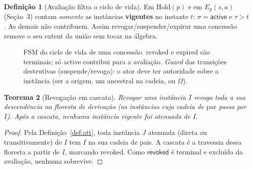 \documentclass[11pt,a4paper]{article}
\newtheorem{theorem}{Teorema}
\theoremstyle{definition}
\newtheorem{definition}[theorem]{Definição}
\begin{document}
\begin{definition}[Avaliação filtra o ciclo de vida]
Em $\mathrm{Hold}(p)$ e em $E_p(s,a)$ (Seção~3) contam \emph{somente} as
instâncias \textbf{vigentes} no instante $t$: $\sigma=\textsf{active}$ e
$\tau>t$. As demais não contribuem. Assim revogar/suspender/expirar uma
concessão remove o seu extent da união sem tocar na álgebra.
\end{definition}

\begin{figure}[h]
\centering
{}
\caption{FSM do ciclo de vida de uma concessão. \textsf{revoked} e
\textsf{expired} são terminais; só \textsf{active} contribui para a
avaliação. \emph{Guard} das transições destrutivas (suspende/revoga): o ator
deve ter autoridade sobre a instância (ser a origem, um ancestral na cadeia,
ou $\Omega$).}
\label{fig:fsm}
\end{figure}

\begin{theorem}[Revogação em cascata]\label{thm:cascade}
Revogar uma instância $I$ revoga toda a sua descendência na floresta de
derivação (as instâncias cuja cadeia de $\mathrm{par}$ passa por $I$). Após a
cascata, nenhuma instância vigente foi atenuada de $I$.
\end{theorem}
\begin{proof}
Pela Definição~\ref{def:att}, toda instância $J$ atenuada (direta ou
transitivamente) de $I$ tem $I$ na sua cadeia de pais. A cascata é a travessia
dessa floresta a partir de $I$, marcando \textsf{revoked}. Como
$\textsf{revoked}$ é terminal e excluída da avaliação, nenhuma sobrevive.
\end{proof}
\end{document}
